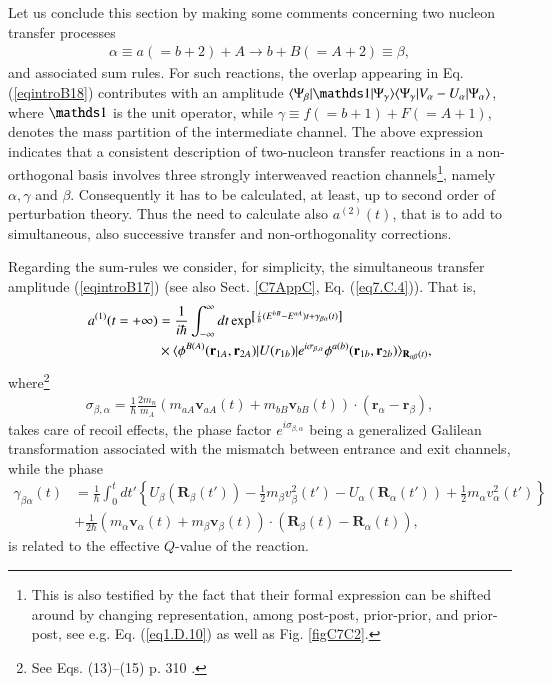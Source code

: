 \begin{subappendices}
 Let us conclude this section by making some comments concerning two nucleon transfer processes
 \begin{align}
 \alpha\equiv a (=b+2)+A\rightarrow b+B(=A+2)\equiv\beta,
 \end{align}
 and associated sum rules.
 For such reactions, the overlap appearing in Eq. (\ref{eqintroB18}) 
 contributes with an amplitude $\braket{\Psi_\beta|\idop|\Psi_\gamma}\braket{\Psi_\gamma|V_\alpha-U_\alpha|\Psi_\alpha}$, where $\idop$ is the unit operator, while $\gamma\equiv f(=b+1)+F(=A+1)$, denotes the mass partition of the intermediate channel. 
 The above expression indicates that a consistent description of two-nucleon transfer reactions in a non-orthogonal basis involves  three strongly interweaved  reaction channels\footnote{This is also testified by the fact that their formal expression can be shifted around by changing representation, among  post-post, prior-prior, and prior-post, see e.g. Eq. (\ref{eq1.D.10}) as well as Fig. \ref{figC7C2}.}, namely $\alpha,\gamma$ and $\beta$. Consequently it has to be calculated, at least, up to second order of perturbation theory. Thus the need to calculate also $a^{(2)}(t)$,  that is to add to simultaneous, also successive transfer and non-orthogonality corrections.
 
 Regarding the sum-rules  we consider,  for simplicity, the simultaneous transfer amplitude (\ref{eqintroB17}) (see also Sect. \ref{C7AppC}, Eq. (\ref{eq7.C.4})). That is,
 \begin{align}\label{eqintroB19}
 \nonumber a^{(1)}(t=+\infty)&=\frac{1}{i\hbar}\int^{\infty}_{-\infty}dt\exp^{\left[\frac{i}{\hbar}(E^{bB}-E^{aA})t+\gamma_{\beta\alpha}(t)\right]}\\
 &\times\langle {\phi^{B(A)}(\mathbf r_{1A},\mathbf r_{2A})|U(r_{1b})|e^{i\sigma_{\beta,\alpha}}\phi^{a(b)}(\mathbf r_{1b},\mathbf r_{2b})} \rangle_{\mathbf R_{\alpha\beta}(t)},
 \end{align}
 where\footnote{See Eqs. (13)--(15) p. 310 \cite{Broglia:04a}.}
 \begin{align}
 \sigma_{\beta,\alpha}=\frac{1}{\hbar}\frac{2m_n}{m_A}(m_{aA}\mathbf v_{aA}(t)+m_{bB}\mathbf v_{bB}(t))\cdot(\mathbf r_\alpha-\mathbf r_\beta),
 \end{align}
 takes care of recoil effects, the phase factor $e^{i\sigma_{\beta,\alpha}}$ being a generalized Galilean transformation associated with the mismatch between entrance and exit channels,  while the phase
 \begin{align}\label{eqintroB21}
 \nonumber\gamma_{\beta\alpha}(t)&=\frac{1}{\hbar}\int^t_0 dt'\left\{U_\beta(\mathbf R_{\beta}(t'))-\frac{1}{2}m_\beta v_\beta^2(t')-U_\alpha(\mathbf R_\alpha(t'))+\frac{1}{2}m_\alpha v_\alpha^2(t')\right\}\\
 &+\frac{1}{2\hbar}\left(m_\alpha \mathbf v_\alpha(t)+m_\beta \mathbf v_\beta(t) \right)\cdot(\mathbf R_\beta(t)-\mathbf R_\alpha(t)),
 \end{align}
 is related to the effective $Q$-value of the reaction.
 

\end{subappendices}
